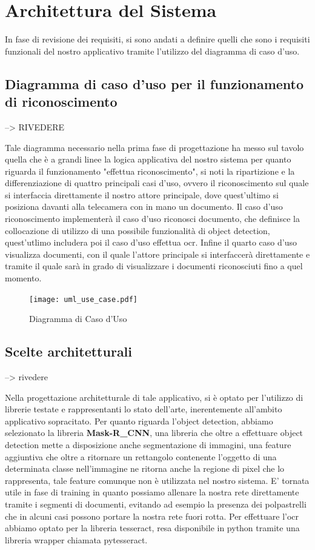 \documentclass[12pt,a4paper]{article}
\newcommand{\mrcnn}{Mask-R\_CNN}
\begin{document}
\section{Architettura del Sistema}

In fase di revisione dei requisiti, si sono andati a definire quelli che sono i requisiti
funzionali del nostro applicativo tramite l'utilizzo del diagramma di
caso d'uso.

\subsection{Diagramma di caso d'uso per il funzionamento di
riconoscimento}

--> RIVEDERE %

Tale diagramma necessario nella prima fase di progettazione ha messo sul
tavolo quella che è a grandi linee la logica applicativa del nostro
sistema per quanto riguarda il funzionamento "effettua riconoscimento", si noti la ripartizione e la differenziazione di quattro principali
casi d'uso, ovvero il riconoscimento sul quale si interfaccia
direttamente il nostro attore principale, dove quest'ultimo si posiziona davanti alla telecamera con in mano un documento. Il caso d'uso riconoscimento
implementerà il caso d'uso riconosci documento, che definisce la collocazione di
utilizzo di una possibile funzionalità di object detection, quest'utlimo
includera poi il caso d'uso effettua ocr.
Infine il quarto caso d'uso visualizza documenti, con il quale l'attore principale si interfaccerà direttamente e tramite il quale sarà in grado di
visualizzare i documenti riconosciuti fino a quel momento.

\begin{figure}[H]
    \caption{Diagramma di Caso d'Uso}
    \centering
    \texttt{[image: uml\_use\_case.pdf]}
\end{figure}

\subsection{Scelte architetturali}

--> rivedere %

Nella progettazione architetturale di tale applicativo, si è optato per
l'utilizzo di librerie testate e rappresentanti lo stato dell'arte,
inerentemente all'ambito applicativo sopracitato.
Per quanto riguarda l'object detection, abbiamo selezionato la libreria
\textbf{\mrcnn}, una libreria che oltre a effettuare object detection mette a
disposizione anche segmentazione di immagini, una feature aggiuntiva che
oltre a ritornare un rettangolo contenente l'oggetto di una determinata
classe nell'immagine ne ritorna anche la regione di pixel che lo
rappresenta, tale feature comunque non è utilizzata nel nostro sistema.
E' tornata utile in fase di training in quanto possiamo allenare la
nostra rete direttamente tramite i segmenti di documenti, evitando ad esempio la
presenza dei polpastrelli che in alcuni casi possono portare la nostra
rete fuori rotta.
Per effettuare l'ocr abbiamo optato per la libreria tesseract,
resa disponibile in python tramite una libreria wrapper chiamata
pytesseract.
\end{document}
